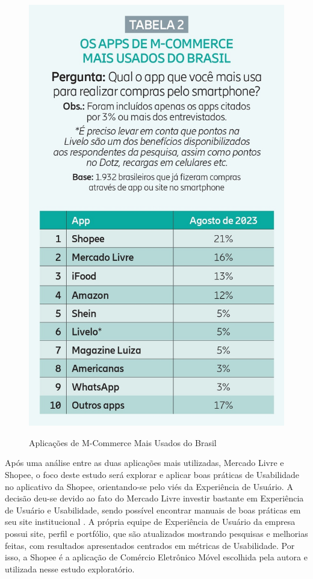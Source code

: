 \begin{figure}[ht]
    \centering
    \caption{Aplicações de M-Commerce Mais Usados do Brasil}
    \includegraphics[keepaspectratio=true,scale=0.9]{figuras/cap05mcommerce.jpg}
    \label{aplim}
\end{figure}

Após uma análise entre as duas aplicações mais utilizadas, Mercado Livre e Shopee, o foco deste estudo será explorar e aplicar boas práticas de Usabilidade no aplicativo da Shopee, orientando-se pelo viés da Experiência de Usuário. A decisão deu-se devido ao fato do Mercado Livre investir bastante em Experiência de Usuário e Usabilidade, sendo possível encontrar manuais de boas práticas em seu site institucional \cite{MercadoPagoCheck}. A própria equipe de Experiência de Usuário da empresa possui site, perfil e portfólio, que são atualizados mostrando pesquisas e melhorias feitas, com resultados apresentados centrados em métricas de Usabilidade. Por isso, a Shopee é a aplicação de Comércio Eletrônico Móvel escolhida pela autora e utilizada nesse estudo exploratório.


